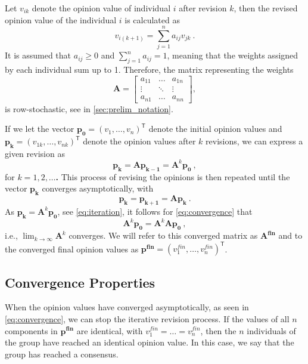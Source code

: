 \documentclass[journal,compsoc,10pt]{IEEEtran}
\newcommand{\T}{\mathsf{T}}            %
\renewcommand{\vec}[1]{\bm{#1}}        %
\newcommand{\mat}[1]{\bm{#1}}          %
\begin{document}
Let $v_{ik}$ denote the opinion value of individual $i$ after revision $k$, then the revised opinion value of the individual $i$ is calculated as
\begin{equation}\label{eq:opinion_revision}
    v_{i(k+1)} = \sum_{j=1}^{n}a_{ij} v_{jk}\ .
\end{equation}
It is assumed that $a_{ij} \geq 0$ and $\sum_{j=1}^{n}a_{ij} = 1$, meaning that the weights assigned by each individual sum up to 1. Therefore, the matrix representing the weights
\[ \mat A = \begin{bmatrix}
a_{11} & \dots & a_{1n}\\
\vdots & \ddots & \vdots\\
a_{n1} & \dots & a_{nn}
\end{bmatrix}, \]
is row-stochastic, see in \cref{sec:prelim_notation}.


If we let the vector $\vec{p_0} = (v_1,\dots,v_n)^\T$ denote the initial opinion values and $\vec{p_k}=(v_{1k},\dots,v_{nk})^\T$ denote the opinion values after $k$ revisions, we can express a given revision as
\begin{equation}\label{eq:iteration}
    \vec{p_k} = \mat A\vec{p_{k-1}} = \mat A^k\vec{p_0} \ ,
\end{equation}
for $k = 1, 2, \dots$\textbf{.} This process of revising the opinions is then repeated until the vector $\vec{p_k}$ converges asymptotically, with 
\begin{equation}\label{eq:convergence}
    \vec{p_k} = \vec{p_{k+1}} = \mat A\vec{p_k}\ .
\end{equation}
As $\vec{p_k} = \mat A^k\vec{p_0}$, see \cref{eq:iteration}, it follows for \cref{eq:convergence} that 
\begin{equation}\label{eq:convergence_matrix}
    \mat A^k\vec{p_0} = \mat A^k\mat A\vec{p_0}\ ,
\end{equation}
i.e., $\lim_{k\rightarrow\infty}\mat A^k$ converges. We will refer to this converged matrix as $\mat{A^{fin}}$ and to the converged final opinion values as $\vec{p^{fin}} = (v_1^{fin},\dots,v_n^{fin})^\T$.

\subsection{Convergence Properties} \label{sec:Convergence_properties}
When the opinion values have converged asymptotically, as seen in \cref{eq:convergence}, we can stop the iterative revision process. If the values of all $n$ components in $\vec{p^{fin}}$ are identical, with $v_1^{fin} = \dots = v_n^{fin}$, then the $n$ individuals of the group have reached an identical opinion value. In this case, we say that the group has reached a consensus.
\end{document}
